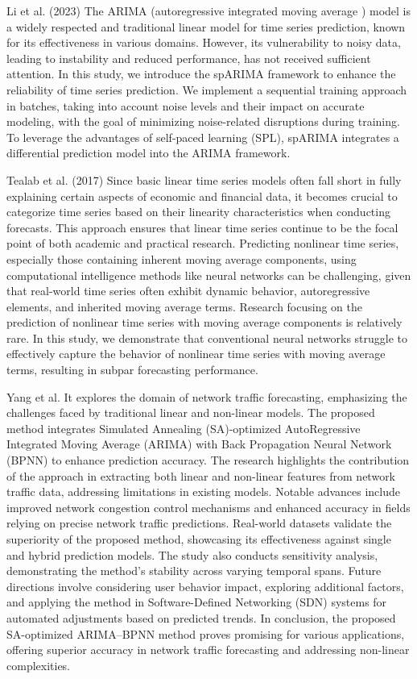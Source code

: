         Li et al. (2023) \cite{yitongli2023} The  ARIMA (autoregressive integrated moving average ) model is a widely respected and traditional linear model for time series prediction, known for its effectiveness in various domains. However, its vulnerability to noisy data, leading to instability and reduced performance, has not received sufficient attention. In this study, we introduce the spARIMA framework to enhance the reliability of time series prediction. We implement a sequential training approach in batches, taking into account noise levels and their impact on accurate modeling, with the goal of minimizing noise-related disruptions during training. To leverage the advantages of self-paced learning (SPL), spARIMA integrates a differential prediction model into the ARIMA framework.
        
        Tealab et al. (2017) \cite{tealab2017} Since basic linear time series models often fall short in fully explaining certain aspects of economic and financial data, it becomes crucial to categorize time series based on their linearity characteristics when conducting forecasts. This approach ensures that linear time series continue to be the focal point of both academic and practical research. Predicting nonlinear time series, especially those containing inherent moving average components, using computational intelligence methods like neural networks can be challenging, given that real-world time series often exhibit dynamic behavior, autoregressive elements, and inherited moving average terms. Research focusing on the prediction of nonlinear time series with moving average components is relatively rare. In this study, we demonstrate that conventional neural networks struggle to effectively capture the behavior of nonlinear time series with moving average terms, resulting in subpar forecasting performance.
        
        Yang et al. \cite{yang2021} It explores the domain of network traffic forecasting, emphasizing the challenges faced by traditional linear and non-linear models. The proposed method integrates Simulated Annealing (SA)-optimized AutoRegressive Integrated Moving Average (ARIMA) with Back Propagation Neural Network (BPNN) to enhance prediction accuracy. The research highlights the contribution of the approach in extracting both linear and non-linear features from network traffic data, addressing limitations in existing models. Notable advances include improved network congestion control mechanisms and enhanced accuracy in fields relying on precise network traffic predictions. Real-world datasets validate the superiority of the proposed method, showcasing its effectiveness against single and hybrid prediction models. The study also conducts sensitivity analysis, demonstrating the method's stability across varying temporal spans. Future directions involve considering user behavior impact, exploring additional factors, and applying the method in Software-Defined Networking (SDN) systems for automated adjustments based on predicted trends. In conclusion, the proposed SA-optimized ARIMA–BPNN method proves promising for various applications, offering superior accuracy in network traffic forecasting and addressing non-linear complexities.
        
